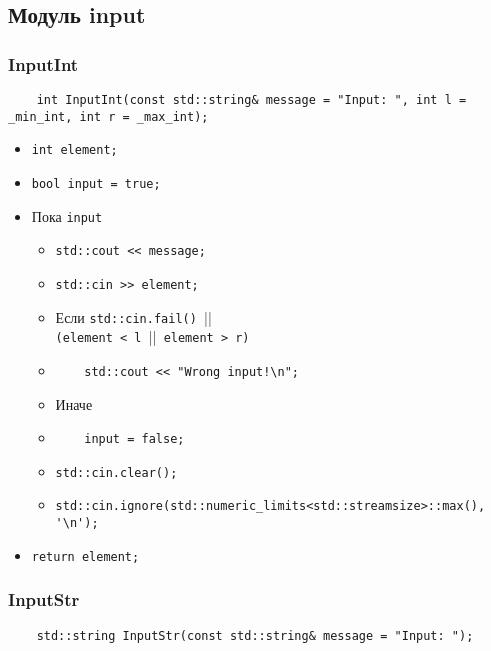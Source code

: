 \subsection{Модуль input}

\subsubsection{InputInt}

\begin{lstlisting}
    int InputInt(const std::string& message = "Input: ", int l = _min_int, int r = _max_int);
\end{lstlisting}

\begin{itemize}
    \item \verb|int element;|
    \item \verb|bool input = true;|
    \item Пока \verb|input|
        \begin{itemize}
            \item \verb|std::cout << message;|
            \item \verb|std::cin >> element;|
            \item Если \verb|std::cin.fail() |||\\
            \verb|(element < l |||\verb| element > r)|
            \item \verb|    std::cout << "Wrong input!\n";|
            \item Иначе
            \item \verb|    input = false;|
            \item \verb|std::cin.clear();|
            \item \verb|std::cin.ignore(std::numeric_limits<std::streamsize>::max(), '\n');|
        \end{itemize}
    \item \verb|return element;|
\end{itemize}

\subsubsection{InputStr}

\begin{lstlisting}
    std::string InputStr(const std::string& message = "Input: ");
\end{lstlisting}

